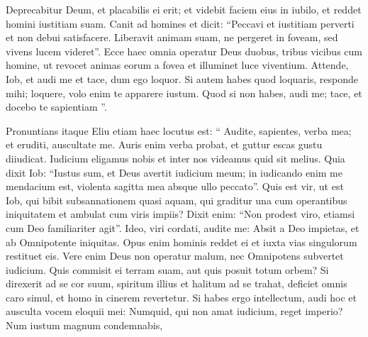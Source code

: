 \begin{biblechapter}
\begin{biblechapter}
\begin{biblechapter}
\begin{biblechapter}
\begin{biblechapter}
\begin{biblechapter}
\begin{biblechapter}
\begin{biblechapter}
\begin{biblechapter}
\begin{biblechapter}
\begin{biblechapter}
\begin{biblechapter}
\begin{biblechapter}
\begin{biblechapter}
\begin{biblechapter}
\begin{biblechapter}
\begin{biblechapter}
\begin{biblechapter}
\begin{biblechapter}
\begin{biblechapter}
\begin{biblechapter}
\begin{biblechapter}
\begin{biblechapter}
\begin{biblechapter}
\begin{biblechapter}
\begin{biblechapter}
\begin{biblechapter}
\begin{biblechapter}
\begin{biblechapter}
\begin{biblechapter}
\begin{biblechapter}
\begin{biblechapter}
\begin{biblechapter}
 \verse Deprecabitur Deum, et placabilis ei erit;
 et videbit faciem eius in iubilo,
 et reddet homini iustitiam suam.
 \verse Canit ad homines et dicit: “Peccavi et iustitiam perverti
 et non debui satisfacere.
 \verse Liberavit animam suam, ne pergeret in foveam,
 sed vivens lucem videret”.
 \verse Ecce haec omnia operatur Deus
 duobus, tribus vicibus cum homine,
 \verse ut revocet animas eorum a fovea
 et illuminet luce viventium.
 \verse Attende, Iob, et audi me
 et tace, dum ego loquor.
 \verse Si autem habes quod loquaris, responde mihi; loquere, volo enim te apparere iustum.
 \verse Quod si non habes, audi me;
 tace, et docebo te sapientiam ”.
 
\begin{biblechapter}
\verse Pronuntians itaque Eliu etiam haec locutus est:
 \verse “ Audite, sapientes, verba mea;
 et eruditi, auscultate me.
 \verse Auris enim verba probat,
 et guttur escas gustu diiudicat.
 \verse Iudicium eligamus nobis
 et inter nos videamus quid sit melius.
 \verse Quia dixit Iob: “Iustus sum,
 et Deus avertit iudicium meum;
 \verse in iudicando enim me mendacium est,
 violenta sagitta mea absque ullo peccato”.
 \verse Quis est vir, ut est Iob,
 qui bibit subsannationem quasi aquam,
 \verse qui graditur una cum operantibus iniquitatem
 et ambulat cum viris impiis?
 \verse Dixit enim: “Non prodest viro,
 etiamsi cum Deo familiariter agit”.
 \verse Ideo, viri cordati, audite me:
 Absit a Deo impietas, et ab Omnipotente iniquitas.
 \verse Opus enim hominis reddet ei
 et iuxta vias singulorum restituet eis.
 \verse Vere enim Deus non operatur malum,
 nec Omnipotens subvertet iudicium.
 \verse Quis commisit ei terram suam,
 aut quis posuit totum orbem?
 \verse Si direxerit ad se cor suum,
 spiritum illius et halitum ad se trahat,
 \verse deficiet omnis caro simul,
 et homo in cinerem revertetur.
 \verse Si habes ergo intellectum, audi hoc
 et ausculta vocem eloquii mei:
 \verse Numquid, qui non amat iudicium, reget imperio?
 Num iustum magnum condemnabis,

\end{biblechapter}
\end{biblechapter}
\end{biblechapter}
\end{biblechapter}
\end{biblechapter}
\end{biblechapter}
\end{biblechapter}
\end{biblechapter}
\end{biblechapter}
\end{biblechapter}
\end{biblechapter}
\end{biblechapter}
\end{biblechapter}
\end{biblechapter}
\end{biblechapter}
\end{biblechapter}
\end{biblechapter}
\end{biblechapter}
\end{biblechapter}
\end{biblechapter}
\end{biblechapter}
\end{biblechapter}
\end{biblechapter}
\end{biblechapter}
\end{biblechapter}
\end{biblechapter}
\end{biblechapter}
\end{biblechapter}
\end{biblechapter}
\end{biblechapter}
\end{biblechapter}
\end{biblechapter}
\end{biblechapter}
\end{biblechapter}
